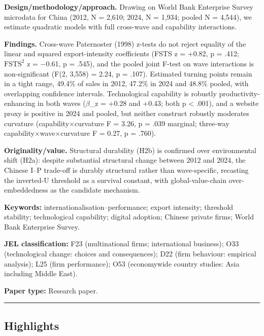 \documentclass[12pt,a4paper]{article}
\begin{document}
\textbf{Design/methodology/approach.} Drawing on World Bank Enterprise
Survey microdata for China (2012, N = 2,610; 2024, N = 1,934; pooled N =
4,544), we estimate quadratic models with full cross-wave and capability
interactions.

\textbf{Findings.} Cross-wave Paternoster (1998) z-tests do not reject
equality of the linear and squared export-intensity coefficients (FSTS z
= +0.82, p = .412; \(\text{FSTS}^2\) z = −0.61, p = .545), and the
pooled joint F-test on wave interactions is non-significant (F(2, 3,558)
= 2.24, p = .107). Estimated turning points remain in a tight range,
49.4\% of sales in 2012, 47.2\% in 2024 and 48.8\% pooled, with
overlapping confidence intervals. Technological capability is robustly
productivity-enhancing in both waves (\(\beta\)\_z = +0.28 and +0.43;
both p \textless{} .001), and a website proxy is positive in 2024 and
pooled, but neither construct robustly moderates curvature
(capability\(\times\)curvature F = 3.26, p = .039 marginal; three-way
capability\(\times\)wave\(\times\)curvature F = 0.27, p = .760).

\textbf{Originality/value.} Structural durability (H2b) is confirmed
over environmental shift (H2a): despite substantial structural change
between 2012 and 2024, the Chinese I--P trade-off is durably structural
rather than wave-specific, recasting the inverted-U threshold as a
survival constant, with global-value-chain over-embeddedness as the
candidate mechanism.

\textbf{Keywords:} internationalisation--performance; export intensity;
threshold stability; technological capability; digital adoption; Chinese
private firms; World Bank Enterprise Survey.

\textbf{JEL classification:} F23 (multinational firms; international
business); O33 (technological change: choices and consequences); D22
(firm behaviour: empirical analysis); L25 (firm performance); O53
(economywide country studies: Asia including Middle East).

\textbf{Paper type:} Research paper.

\begin{center}\rule{0.5\linewidth}{0.5pt}\end{center}

\hypertarget{highlights}{%
\subsection{Highlights}\label{highlights}}
\end{document}
